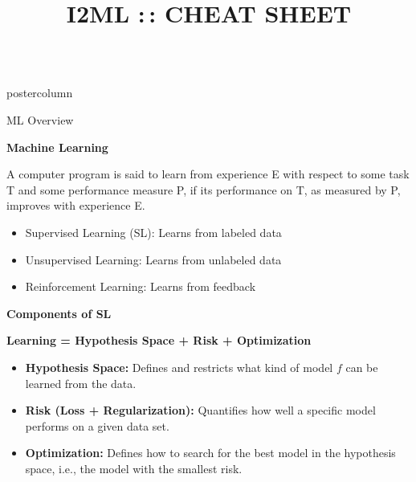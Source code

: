 \documentclass{beamer}
\title{I2ML :\,: CHEAT SHEET} %
\newlength{\columnheight} %
\begin{document}
\begin{frame}[fragile]{}
\begin{columns}
	\begin{column}{.31\textwidth}
		\begin{beamercolorbox}[center]{postercolumn}
			\begin{minipage}{.98\textwidth}
				\parbox[t][\columnheight]{\textwidth}{

					\begin{myblock}{ML Overview}

						\begin{codebox}
							\textbf{Machine Learning}
						\end{codebox}
            A computer program is said to learn from experience E with respect to some task T and some performance measure P, 
            if its performance on T, as measured by P, improves with experience E.
            \begin{itemize}[$\bullet$] 
              \setlength{\itemindent}{+.3in}
                          \item Supervised Learning (SL): Learns from labeled data
                          \item Unsupervised Learning: Learns from unlabeled data
                          \item Reinforcement Learning: Learns from feedback
                         \end{itemize}

              \begin{codebox}
                \textbf{Components of SL}
              \end{codebox}
              \textbf{Learning = Hypothesis Space + Risk + Optimization}
              \begin{itemize}[$\bullet$] 
                \setlength{\itemindent}{+.3in}
                \item \textbf{Hypothesis Space:} Defines and restricts what kind of model 
                $f$ can be learned from the data.
                \item \textbf{Risk (Loss + Regularization):} Quantifies how well a specific model performs on a given 
                data set.
                \item \textbf{Optimization:} Defines how to search for the best model in the 
                hypothesis space, i.e., the model with the smallest risk.
              \end{itemize}

\end{myblock}


}
\end{minipage}
\end{beamercolorbox}
\end{column}
\end{columns}
\end{frame}
\end{document}
